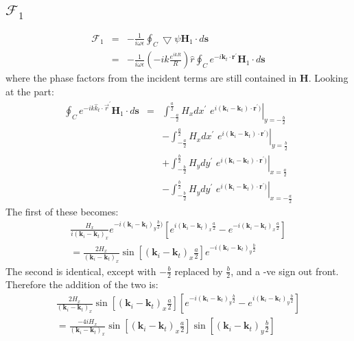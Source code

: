 \documentclass[a4article,12pt]{article}
\newcommand{\kvec}[0]{{\mathbf k}}
\begin{document}
\subsection{${\mathcal F}_1$}

\begin{eqnarray}
\mathcal{F}_1 & = & - \frac{1}{i \omega \epsilon} \oint_C \bigtriangledown \psi \mathbf{H}_1 \cdot d \mathbf{s} \\
& = & - \frac{1}{i \omega \epsilon} \left( - i k \frac{e^{i k R}}{R} \right) \hat{r} \oint_C e^{-i \kvec_t \cdot \mathbf{r}^{\prime}}  \mathbf{H}_1 \cdot d \mathbf{s}
\end{eqnarray}
%
where the phase factors from the incident terms are still contained in $\mathbf{H}$.
Looking at the part:
%
\begin{eqnarray}
\oint_C e^{-i k \hat{k}_t \cdot \vec{r}^{\prime}}  \mathbf{H}_1 \cdot d \mathbf{s}  & = & \int_{-\frac{a}{2}}^{\frac{a}{2}}  \left. H_x dx^{\prime} \, \, e^{i ( \kvec_i - \kvec_t ) \cdot \mathbf{r}^{\prime})}  \right|_{y=-\frac{b}{2}} \nonumber \\
&  & - \int_{-\frac{a}{2}}^{\frac{a}{2}} \left.  H_x dx^{\prime} \, \, e^{i (\kvec_i - \kvec_t) \cdot \mathbf{r}^{\prime})} \right|_{y=\frac{b}{2}}\nonumber  \\
&  & + \int_{-\frac{b}{2}}^{\frac{b}{2}}  \left. H_y dy^{\prime} \, \, e^{i (\kvec_i - \kvec_t) \cdot \mathbf{r}^{\prime})} \right|_{x=\frac{a}{2}} \nonumber \\
&  & - \int_{-\frac{b}{2}}^{\frac{b}{2}}  \left. H_y dy^{\prime} \, \, e^{i (\kvec_i - \kvec_t) \cdot \mathbf{r}^{\prime})} \right|_{x=-\frac{a}{2}}
\end{eqnarray}
%
The first of these becomes:
%
\begin{eqnarray}
\frac{H_x}{i (\kvec_i - \kvec_t)_x}  e^{-i (\kvec_i - \kvec_t)_y \frac{b}{2})} \left[ e^{i (\kvec_i - \kvec_t)_x \frac{a}{2}} - e^{ -i (\kvec_i - \kvec_t)_x \frac{a}{2}} \right] \\
= \frac{2 H_x}{(\kvec_i - \kvec_t)_x}  \sin \left[ (\kvec_i - \kvec_t)_x \frac{a}{2} \right] e^{-i (\kvec_i - \kvec_t)_y \frac{b}{2}}  
\end{eqnarray}
%
The second is identical, except with $-\frac{b}{2}$ replaced by $\frac{b}{2}$, and a -ve sign out front. Therefore the addition of the two is:
%
\begin{eqnarray}
\frac{2 H_x}{(\kvec_i - \kvec_t)_x}  \sin \left[ (\kvec_i - \kvec_t)_x \frac{a}{2} \right] \left[ e^{-i (\kvec_i - \kvec_t)_y \frac{b}{2}} - e^{i (\kvec_i - \kvec_t)_y \frac{b}{2}} \right] \\
= \frac{-4 i H_x}{(\kvec_i - \kvec_t)_x}  \sin \left[ (\kvec_i - \kvec_t)_x \frac{a}{2} \right] \sin \left[ (\kvec_i - \kvec_t)_y \frac{b}{2} \right]
\end{eqnarray}
\end{document}
